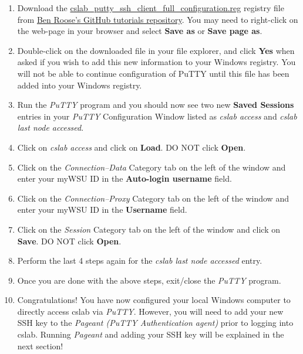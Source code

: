 \documentclass[12pt]{article}
\begin{document}
\begin{flushleft}
\begin{enumerate}
  \item Download the \href{https://raw.githubusercontent.com/benroose/tutorials/master/cslab_tutorials/cslab_ssh_client_config_files/cslab_putty_ssh_client_full_configuration.reg}{cslab\_putty\_ssh\_client\_full\_configuration.reg} registry file from \href{https://github.com/benroose/tutorials/tree/master/cslab_tutorials/}{Ben Roose's GitHub tutorials repository}. You may need to right-click on the web-page in your browser and select \textbf{Save as} or \textbf{Save page as}.
  \item Double-click on the downloaded file in your file explorer, and click \textbf{Yes} when asked if you wish to add this new information to your Windows registry. You will not be able to continue configuration of PuTTY until this file has been added into your Windows registry.
  \item Run the \textit{PuTTY} program and you should now see two new \textbf{Saved Sessions} entries in your \textit{PuTTY} Configuration Window listed as \textit{cslab access} and \textit{cslab last node accessed}.
  \item Click on \textit{cslab access} and click on \textbf{Load}. DO NOT click \textbf{Open}.
  \item Click on the \textit{Connection--Data} Category tab on the left of the window and enter your myWSU ID in the \textbf{Auto-login username} field.
  \item Click on the \textit{Connection--Proxy} Category tab on the left of the window and enter your myWSU ID in the \textbf{Username} field.
  \item Click on the \textit{Session} Category tab on the left of the window and click on \textbf{Save}. DO NOT click \textbf{Open}.
  \item Perform the last 4 steps again for the \textit{cslab last node accessed} entry.
  \item Once you are done with the above steps, exit/close the \textit{PuTTY} program.
  \item Congratulations! You have now configured your local Windows computer to directly access cslab via \textit{PuTTY}. However, you will need to add your new SSH key to the \textit{Pageant (PuTTY Authentication agent)} prior to logging into cslab. Running \textit{Pageant} and adding your SSH key will be explained in the next section!
\end{enumerate}


\end{flushleft}
\end{document}
